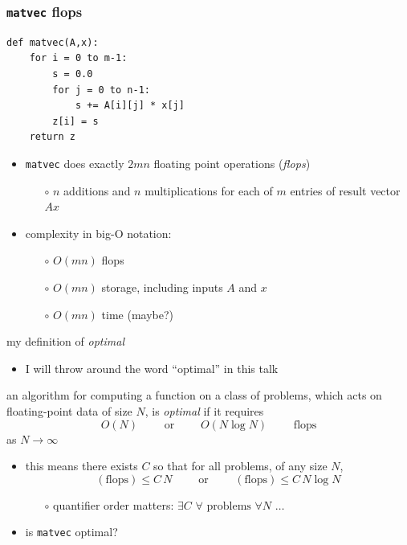 \documentclass[10pt,
               svgnames,
               hyperref={colorlinks,citecolor=DeepPink4,linkcolor=FireBrick,urlcolor=Maroon},
               usepdftitle=false]{beamer}
\newcommand{\ftt}[1]{{\color{blue} \texttt{#1}}}
\newcommand{\optimaldef}{
\begin{definition}
an algorithm for computing a function on a class of problems, which acts on floating-point data of size $N$, is \emph{optimal} if it requires
   $$O(N) \qquad \text{ or } \qquad O(N\log N) \qquad \text{ flops}$$
as $N\to\infty$
\end{definition}
}
\begin{document}
\begin{frame}[fragile]
\frametitle{\texttt{matvec} flops}
\begin{center}
\begin{minipage}{0.7\textwidth}
\begin{verbatim}
def matvec(A,x):
    for i = 0 to m-1:
        s = 0.0
        for j = 0 to n-1:
            s += A[i][j] * x[j]
        z[i] = s
    return z
\end{verbatim}
\end{minipage}
\end{center}

\bigskip
\begin{itemize}
\item \ftt{matvec} does exactly $2mn$ floating point operations (\emph{flops})
    \begin{itemize}
    \item[$\circ$] $n$ additions and $n$ multiplications for each of $m$ entries of result vector $Ax$
    \end{itemize}
\item complexity in big-O notation:
    \begin{itemize}
    \item[$\circ$] $O(mn)$ flops
    \item[$\circ$] $O(mn)$ storage, including inputs $A$ and $x$
    \item[$\circ$] $O(mn)$ time (maybe?)
    \end{itemize}
\end{itemize}
\end{frame}


\begin{frame}{my definition of \emph{optimal}}

\begin{itemize}
\item I will throw around the word ``optimal'' in this talk
\end{itemize}

\optimaldef

\begin{itemize}
\item this means there exists $C$ so that for all problems, of any size $N$,
   $$(\text{flops}) \le C\, N \qquad \text{ or } \qquad (\text{flops}) \le C\, N\log N$$

    \begin{itemize}
    \item[$\circ$] quantifier order matters: \quad $\exists C \,\, \forall \text{ problems} \,\, \forall N \,\,  \dots$
    \end{itemize}
\item is \ftt{matvec} optimal?
\end{itemize}
\end{frame}
\end{document}

